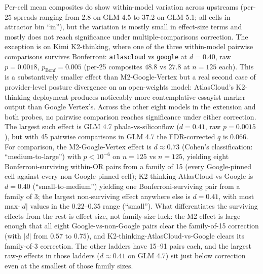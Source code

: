 \documentclass[11pt,a4paper]{article}
\begin{document}
Per-cell mean composites do show within-model variation across upstreams (per-25 spreads ranging from 2.8 on GLM 4.5 to 37.2 on GLM 5.1; all cells in attractor bin ``in''), but the variation is mostly small in effect-size terms and mostly does not reach significance under multiple-comparisons correction. The exception is on Kimi K2-thinking, where one of the three within-model pairwise comparisons survives Bonferroni: \texttt{atlascloud} vs \texttt{google} at $d{=}0.40$, raw $p{=}0.0018$, $p_\text{Bonf}{=}0.005$ (per-25 composites $48.8$ vs $27.8$ at $n{=}125$ each). This is a substantively smaller effect than M2-Google-Vertex but a real second case of provider-level posture divergence on an open-weights model: AtlasCloud's K2-thinking deployment produces noticeably more contemplative-essayist-marker output than Google Vertex's. Across the other eight models in the extension and both probes, no pairwise comparison reaches significance under either correction. The largest such effect is GLM 4.7 phala-vs-siliconflow ($d{=}0.41$, raw $p{=}0.0015$), but with 45 pairwise comparisons in GLM 4.7 the FDR-corrected $q$ is $0.066$. For comparison, the M2-Google-Vertex effect is $d \approx 0.73$ (Cohen's classification: ``medium-to-large'') with $p<10^{-6}$ on $n{=}125$ vs $n{=}125$, yielding eight Bonferroni-surviving within-OR pairs from a family of 15 (every Google-pinned cell against every non-Google-pinned cell); K2-thinking-AtlasCloud-vs-Google is $d{=}0.40$ (``small-to-medium'') yielding one Bonferroni-surviving pair from a family of 3; the largest non-surviving effect anywhere else is $d{=}0.41$, with most max-$|d|$ values in the $0.22$--$0.35$ range (``small''). What differentiates the surviving effects from the rest is effect size, not family-size luck: the M2 effect is large enough that all eight Google-vs-non-Google pairs clear the family-of-15 correction (with $|d|$ from $0.57$ to $0.75$), and K2-thinking-AtlasCloud-vs-Google clears its family-of-3 correction. The other ladders have 15--91 pairs each, and the largest raw-$p$ effects in those ladders ($d \approx 0.41$ on GLM 4.7) sit just below correction even at the smallest of those family sizes.
\end{document}
